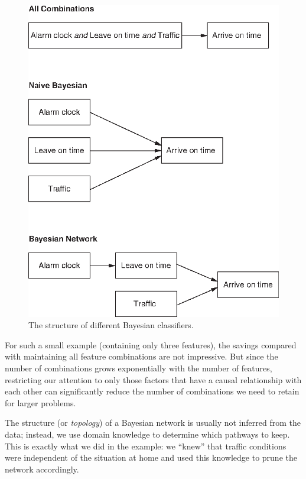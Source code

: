 \begin{figure}
\centerline{\includegraphics[scale=0.9]{img/bayesnets}}
  \caption{The structure of different Bayesian classifiers.}
  \label{fig:bayesnets}\vspace*{-9pt}
\end{figure}

For such a small example (containing only three features), the savings
compared with maintaining all feature combinations are not impressive.
But since the number of combinations grows exponentially with the
number of features, restricting our attention to only those factors
that have a causal relationship with each other can significantly
reduce the number of combinations we need to retain for larger
problems.

The structure (or \emph{topology})  of a Bayesian network is usually
not inferred from the data; instead, we use domain knowledge\vadjust{\pagebreak} to
determine which pathways to keep. This is exactly what we did in the
example: we ``knew'' that traffic conditions were independent of the
situation at home and used this knowledge to prune the network
accordingly.

